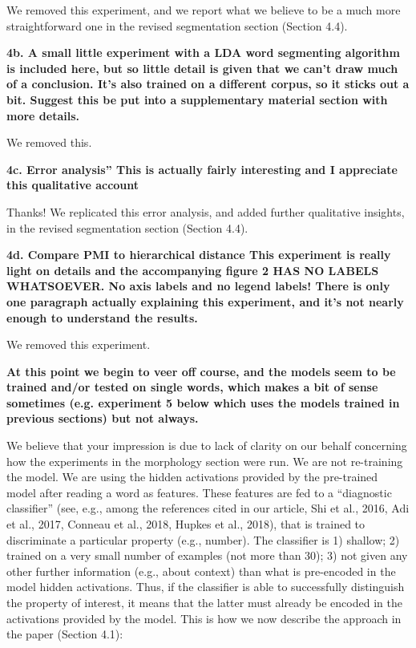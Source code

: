 \documentclass{article}[11pt,a4paper,oneside]
\begin{document}
We removed this experiment, and we report what we believe to be a much more straightforward one in the revised segmentation section (Section 4.4).
\newline

\textbf{4b. A small little experiment with a LDA word segmenting algorithm is included here, but so little detail is given that we can't draw much of a conclusion.  It's also trained on a different corpus, so it sticks out a bit.  Suggest this be put into a supplementary material section with more details.}

We removed this.
\newline

\textbf{4c. Error analysis'' This is actually fairly interesting and I appreciate this qualitative account}

Thanks! We replicated this error analysis, and added further qualitative insights, in the revised segmentation section (Section 4.4).
\newline

\textbf{4d. Compare PMI to hierarchical distance This experiment is really light on details and the accompanying figure 2 HAS NO LABELS WHATSOEVER.  No axis labels and no legend labels!  There is only one paragraph actually explaining this experiment, and it's not nearly enough to understand the results.}

We removed this experiment.
\newline

\textbf{At this point we begin to veer off course, and the models seem to be trained and/or tested on single words, which makes a bit of sense sometimes (e.g. experiment 5 below which uses the models trained in previous sections) but not always.}

We believe that your impression is due to lack of clarity on our behalf concerning how the experiments in the morphology section were run. We are not re-training the model. We are using the hidden activations provided by the pre-trained model after reading a word as features. These features are fed to a ``diagnostic classifier'' (see, e.g., among the references cited in our article, Shi et al., 2016, Adi et al., 2017, Conneau et al., 2018, Hupkes et al., 2018), that is trained to discriminate a particular property (e.g., number). The classifier is 1) shallow; 2) trained on a very small number of examples (not more than 30); 3) not given any other further information (e.g., about context) than what is pre-encoded in the model hidden activations. Thus, if the classifier is able to successfully distinguish the property of interest, it means that the latter must already be encoded in the activations provided by the model. This is how we now describe the approach in the paper (Section 4.1):
\end{document}
